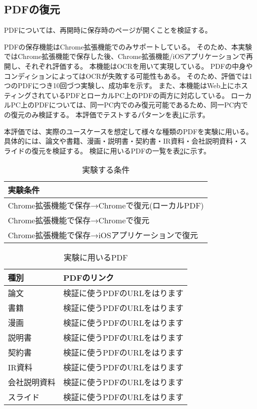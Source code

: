 \subsection{PDFの復元}
PDFについては、再開時に保存時のページが開くことを検証する。

PDFの保存機能はChrome拡張機能でのみサポートしている。
そのため、本実験ではChrome拡張機能で保存した後、Chrome拡張機能/iOSアプリケーションで再開し、それぞれ評価する。
本機能はOCRを用いて実現している。
PDFの中身やコンディションによってはOCRが失敗する可能性もある。
そのため、評価では1つのPDFにつき10回づつ実験し、成功率を示す。
また、本機能はWeb上にホスティングされているPDFとローカルPC上のPDFの両方に対応している。
ローカルPC上のPDFについては、同一PC内でのみ復元可能であるため、同一PC内での復元のみ検証する。
本評価でテストするパターンを表\ref{tb:evl-pdf-conditions}に示す。

本評価では、実際のユースケースを想定して様々な種類のPDFを実験に用いる。
具体的には、論文や書籍、漫画・説明書・契約書・IR資料・会社説明資料・スライドの復元を検証する。
検証に用いるPDFの一覧を表\ref{tb:evl-pdf-list}に示す。

\begin{table}[htbp]
  \label{tb:evl-pdf-conditions}
  \caption{実験する条件}
  \begin{center}
    \begin{tabular}{|l|}
    \hline
    実験条件  \\ \hline
    Chrome拡張機能で保存→Chromeで復元(ローカルPDF) \\ \hline
    Chrome拡張機能で保存→Chromeで復元 \\ \hline
    Chrome拡張機能で保存→iOSアプリケーションで復元 \\ \hline
    \end{tabular}
  \end{center}
\end{table}

\begin{table}[htbp]
  \label{tb:evl-pdf-list}
  \caption{実験に用いるPDF}
  \begin{center}
    \begin{tabular}{|l|l|}
    \hline
    種別 & PDFのリンク  \\ \hline
    論文 & 検証に使うPDFのURLをはります  \\ \hline
    書籍 & 検証に使うPDFのURLをはります  \\ \hline
    漫画 & 検証に使うPDFのURLをはります  \\ \hline
    説明書 & 検証に使うPDFのURLをはります  \\ \hline
    契約書 & 検証に使うPDFのURLをはります  \\ \hline
    IR資料 & 検証に使うPDFのURLをはります  \\ \hline
    会社説明資料 & 検証に使うPDFのURLをはります  \\ \hline
    スライド & 検証に使うPDFのURLをはります  \\ \hline
    \end{tabular}
  \end{center}
\end{table}
